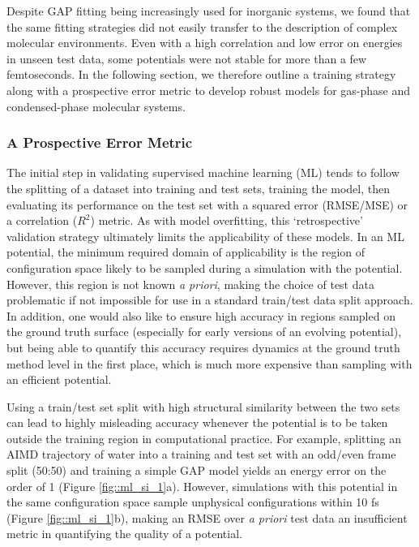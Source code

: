 \documentclass[../../main.tex]{subfiles}
\begin{document}
Despite GAP fitting being increasingly used for inorganic systems, we found that the same fitting strategies did not easily transfer to the description of complex molecular environments. Even with a high correlation and low error on energies in unseen test data, some potentials were not stable for more than a few femtoseconds. In the following section, we therefore outline a training strategy along with a prospective error metric to develop robust models for gas-phase and condensed-phase molecular systems.

\subsubsection{A Prospective Error Metric}

The initial step in validating supervised machine learning (ML) tends to follow the splitting of a dataset into training and test sets, training the model, then evaluating its performance on the test set with a squared error (RMSE/MSE) or a correlation ($R^2$) metric. As with model overfitting, this ‘retrospective’ validation strategy ultimately limits the applicability of these models.\cite{Kearnes2021, Cawley2010, Kramer2010, Li2017jcim, Chen2019plos, Kovacs2021, Sheridan2013} In an ML potential, the minimum required domain of applicability is the region of configuration space likely to be sampled during a simulation with the potential. However, this region is not known \emph{a priori}, making the choice of test data problematic if not impossible for use in a standard train/test data split approach. In addition, one would also like to ensure high accuracy in regions sampled on the ground truth surface (especially for early versions of an evolving potential), but being able to quantify this accuracy requires dynamics at the ground truth method level in the first place, which is much more expensive than sampling with an efficient potential. 

Using a train/test set split with high structural similarity between the two sets can lead to highly misleading accuracy whenever the potential is to be taken outside the training region in computational practice. For example, splitting an AIMD trajectory of water into a training and test set with an odd/even frame split (50:50) and training a simple GAP model yields an energy error on the order of 1 \kcalx (Figure \ref{fig::ml_si_1}a). However, simulations with this potential in the same configuration space sample unphysical configurations within 10 fs (Figure \ref{fig::ml_si_1}b), making an RMSE over \emph{a priori} test data an insufficient metric in quantifying the quality of a potential. 
\end{document}
